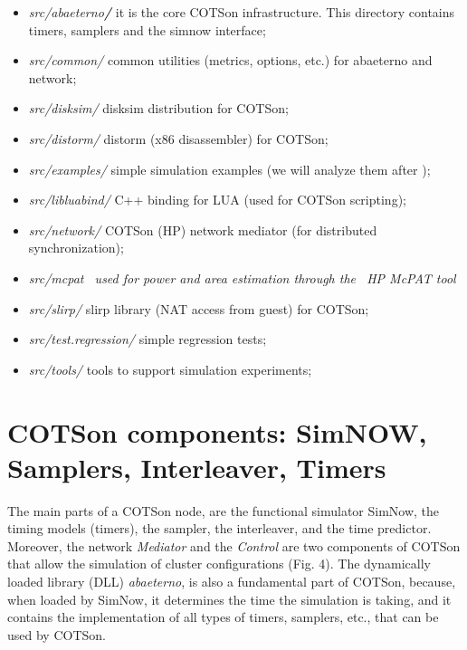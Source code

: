 \documentclass[a4paper]{article}
\begin{document}
\begin{itemize}
\item {
\textit{src/abaeterno}\textbf{\textit{/}} it is the core COTSon
infrastructure. This directory contains timers, samplers and the simnow
interface; }
\item {
\textit{src/common/} common utilities (metrics, options, etc.) for
abaeterno and network;}
\item {
\textit{src/disksim/} disksim distribution for COTSon;}
\item {
\textit{src/distorm/} distorm (x86 disassembler) for COTSon;}
\item {
\textit{src/examples/} simple simulation examples (we will analyze them
after );}
\item {
\textit{src/libluabind/} C++ binding for LUA (used for COTSon
scripting);}
\item {
\textit{src/network/} COTSon (HP) network mediator (for distributed
synchronization);}
\item {\itshape
src/mcpat \ used for power and area estimation through the \ HP McPAT
tool}
\item {
\textit{src/slirp/} slirp library (NAT access from guest) for COTSon;}
\item {
\textit{src/test.regression/} simple regression tests;}
\item {
\textit{src/tools/} tools to support simulation experiments;}
\end{itemize}

\bigskip

\section[COTSon components: SimNOW, Samplers, Interleaver,
Timers]{COTSon components: SimNOW, Samplers, Interleaver, Timers}
{
The main parts of a COTSon node, are the functional simulator SimNow,
the timing models (timers), the sampler, the interleaver, and the time
predictor. Moreover, the network \textit{Mediator} and the
\textit{Control} are two components of COTSon that allow the simulation
of cluster configurations (Fig. 4). The dynamically loaded library
(DLL) \textit{abaeterno}, is also a fundamental part of COTSon,
because, when loaded by SimNow, it determines the time the simulation
is taking, and it contains the implementation of all types of timers,
samplers, etc., that can be used by COTSon.}
\end{document}
